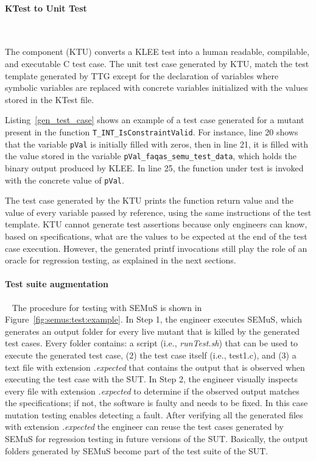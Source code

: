 

\paragraph{KTest to Unit Test}\ 





The component  (KTU) converts a KLEE test into a human readable, compilable, and executable C test case. The unit test case generated by KTU, match the test template generated by TTG except for the declaration of variables where symbolic variables are replaced with concrete variables initialized with the values stored in the KTest file.
 
Listing~\ref{gen_test_case} shows an example of a test case generated for a mutant present in the function \texttt{T\_INT\_Is\-ConstraintValid}. For instance, line 20 shows that the variable \texttt{pVal} is initially filled with zeros, then in line 21, it is filled with the value stored in the variable \texttt{pVal\_faqas\_semu\_test\_data}, which holds the binary output produced by KLEE. In line 25, the function under test is invoked with the concrete value of \texttt{pVal}. 

The test case generated by the KTU prints the function return value and the value of every variable passed by reference, using the same instructions of the test template.
KTU cannot generate test assertions because only engineers can know, based on specifications, what are the values to be expected at the end of the test case execution.
However, the generated printf invocations still play the role of an oracle for regression testing, as explained in the next sections.

\paragraph{Test suite augmentation} \ 
\label{sec:Semus:augment}
The procedure for testing with SEMuS is shown in Figure~\ref{fig:semus:test:example}.
In Step 1, the engineer executes SEMuS, which generates an output folder for every live mutant that is killed by the generated test cases.
Every folder contains: a script (i.e., \emph{runTest.sh}) that can be used to execute the generated test case, (2) the test case itself (i.e., test1.c), and (3) a text file with extension \emph{.expected} that contains the output that is observed when executing the test case with the SUT.
In Step 2, the engineer visually inspects every file with extension \emph{.expected} to determine if the observed output matches the specifications; if not, the software is faulty and needs to be fixed. In this case mutation testing enables detecting a fault. 
After verifying all the generated files with extension \emph{.expected} the engineer can reuse the test cases generated by SEMuS for regression testing in future versions of the SUT. Basically, the output folders generated by SEMuS become part of the test suite of the SUT.

